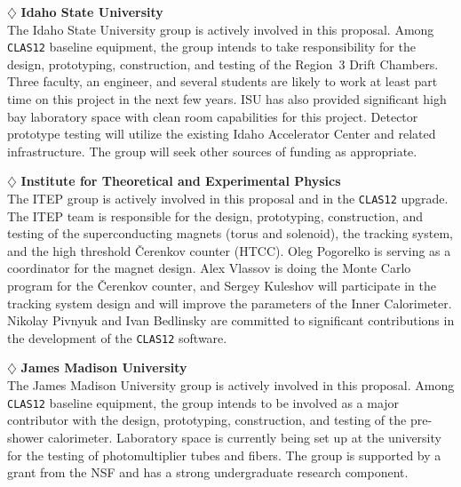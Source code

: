 \vskip 0.4cm

\noindent
$\diamondsuit$ {\bf Idaho State University} \\[0.2ex]

\noindent
The Idaho State University group is actively involved in this proposal.
Among {\tt CLAS12} baseline equipment, the group intends to take 
responsibility for the design, prototyping, construction, and testing of 
the Region~3 Drift Chambers. Three faculty, an engineer, and several students
are likely to work at least part time on this project in the next few years. 
ISU has also provided significant high bay laboratory space with clean room 
capabilities for this project.  Detector prototype testing will utilize the
existing Idaho Accelerator Center and related infrastructure.  The group will 
seek other sources of funding as appropriate.

\vskip 0.4cm

\noindent
$\diamondsuit$ {\bf Institute for Theoretical and Experimental Physics} \\[0.2ex]

\noindent
The ITEP group is actively involved in this proposal and in the {\tt CLAS12} 
upgrade.  The ITEP team is responsible for the design, prototyping,
construction, and testing of the superconducting magnets (torus and solenoid), 
the tracking system, and the high threshold {\v C}erenkov counter (HTCC). 
Oleg Pogorelko is serving as a coordinator for the magnet design.  Alex 
Vlassov is doing the Monte Carlo program for the {\v C}erenkov counter, 
and Sergey Kuleshov will participate in the tracking system design and will 
improve the parameters of the Inner Calorimeter.  Nikolay Pivnyuk and Ivan 
Bedlinsky are committed to significant contributions in the development of 
the {\tt CLAS12} software.

\vskip 0.4cm

\noindent
$\diamondsuit$ {\bf James Madison University} \\[0.2ex]

\noindent
The James Madison University group is actively involved in this proposal.
Among {\tt CLAS12} baseline equipment, the group intends to be involved 
as a major contributor with the design, prototyping, construction, and 
testing of the pre-shower calorimeter.  Laboratory space is currently 
being set up at the university for the testing of photomultiplier tubes 
and fibers.  The group is supported by a grant from the NSF and has a strong 
undergraduate research component.

